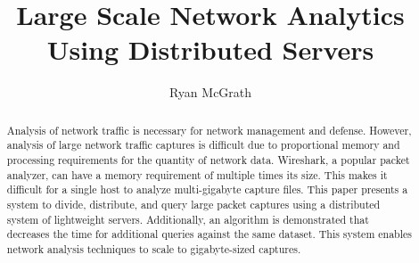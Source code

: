 \documentclass{article}
\begin{document}
\title{Large Scale Network Analytics Using Distributed Servers}
\author{Ryan McGrath}
\maketitle

\begin{abstract}

  Analysis of network traffic is necessary for network management and defense. However, analysis of large network traffic captures is difficult due to proportional memory and processing requirements for the quantity of network data. Wireshark, a popular packet analyzer, can have a memory requirement of multiple times its size. This makes it difficult for a single host to analyze multi-gigabyte capture files.  This paper presents a system to divide, distribute, and query large packet captures using a distributed system of lightweight servers. Additionally, an algorithm is demonstrated that decreases the time for additional queries against the same dataset. This system enables network analysis techniques to scale to gigabyte-sized captures.


\end{abstract}
\end{document}
